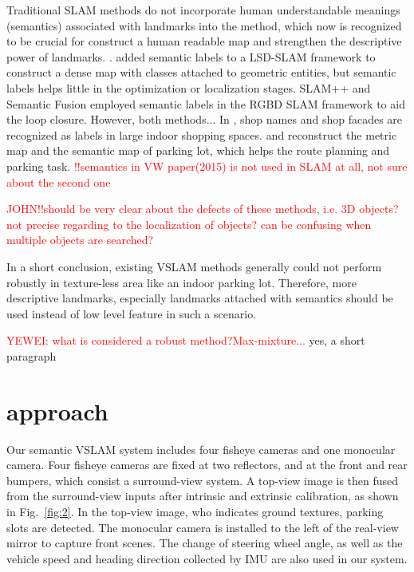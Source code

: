 \documentclass[journal]{IEEEtran}
\newcommand{\Reffig}[1]{Fig.~\ref{#1}}
\newcommand{\COMMENT}[1]{\textcolor{red}{#1}}
\begin{document}
Traditional SLAM methods do not incorporate human understandable meanings (semantics) associated with landmarks into the method, which now is recognized to be crucial for construct a human readable map and strengthen the descriptive power of landmarks\citep{}.
\cite{Cadena:2016fp}. \cite{Li2016Semi} added semantic labels to a LSD-SLAM framework to construct a dense map with classes attached to geometric entities, but semantic labels helps little in the optimization or localization stages.
SLAM++ \cite{Salas2013SLAM} and Semantic Fusion \cite{Mccormac2017SemanticFusion} employed semantic labels in the RGBD SLAM framework to aid the loop closure. 
However, both methods...
In \cite{Wang2015Lost}, shop names and shop facades are recognized as labels in large indoor shopping spaces.
\cite{Grimmett2015Integrating} and \cite{Himstedt2017Online} reconstruct the metric map and the semantic map of parking lot, which helps the route planning and parking task.
\COMMENT{!!semantics in VW paper(2015) is not used in SLAM at all, not sure about the second one }

\COMMENT{JOHN!!should be very clear about the defects of these methods, i.e. 3D objects? not precise regarding to the localization of objects? can be confusing when multiple objects are searched?}

 

In a short conclusion, existing VSLAM methods generally could not perform robustly in texture-less area like an indoor parking lot.
Therefore, more descriptive landmarks, especially landmarks attached with semantics should be used instead of low level feature in such a scenario.

\COMMENT{YEWEI: what is considered a robust method?Max-mixture...}
yes, a short paragraph 
\section{approach}

Our semantic VSLAM system includes four fisheye cameras and one monocular camera. 
Four fisheye cameras are fixed at two reflectors, and at the front and rear bumpers, which consist a surround-view system. 
A top-view image is then fused from the surround-view inputs after intrinsic and extrinsic calibration, as shown in \Reffig{fig:2}. 
In the top-view image, who indicates ground textures, parking slots are detected. 
The monocular camera is installed to the left of the real-view mirror to capture front scenes. 
The change of steering wheel angle, as well as the vehicle speed and heading direction collected by IMU are also used in our system.
\end{document}
